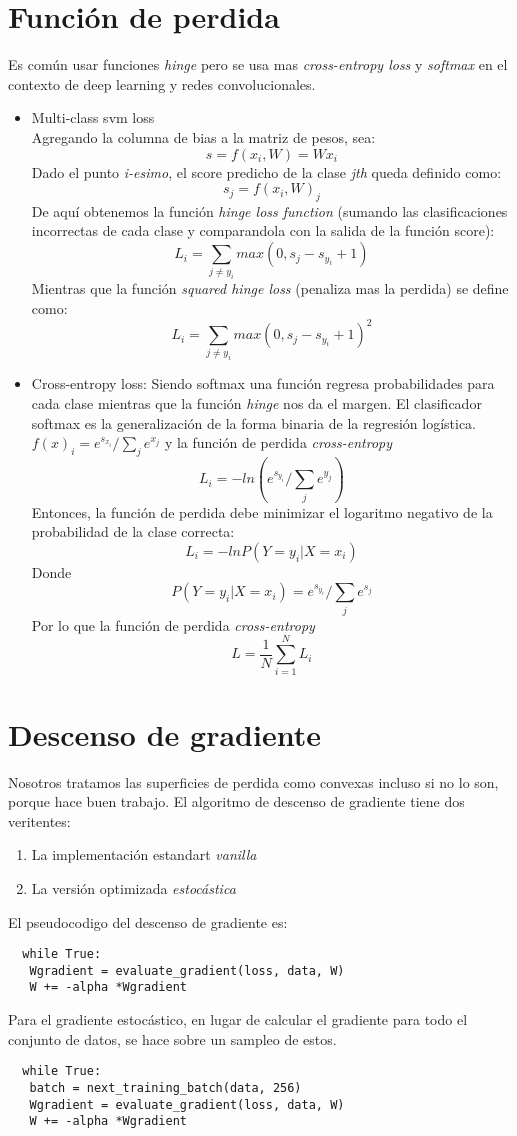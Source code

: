 \documentclass{article}
\begin{document}
\section{Función de perdida}
  Es común usar funciones \textit{hinge} pero se usa mas 
  \textit{cross-entropy loss} y \textit{softmax} en el contexto de
  deep learning y redes convolucionales.
  \begin{itemize}
      \item Multi-class svm loss \\
       Agregando la columna de bias a la matriz de pesos, sea:
       \[
       s = f(x_i, W) = Wx_i
       \]
	   Dado el punto \textit{i-esimo}, el score predicho de la clase \textit{jth} queda definido como:
	   \[
	   s_j = f(x_i, W)_j
	   \]
	   De aquí obtenemos la función \textit{hinge loss function}
	   (sumando las clasificaciones incorrectas de cada clase y
	   comparandola con la salida de la función score):
	   \[
	   L_i = \sum_{j \neq y_i} max(0, s_j - s_{y_i}+1)
	   \]
	   Mientras que la función \textit{squared hinge loss} (penaliza
	   mas la perdida) se define como:
	   \[
	   L_i = \sum_{j \neq y_i} max(0, s_j - s_{y_i}+1)^2
	   \]
    \item Cross-entropy loss: Siendo softmax una función regresa probabilidades 
    para cada clase mientras que la función  \textit{hinge} nos da el margen. El
    clasificador softmax es la generalización de la forma binaria de la regresión
    logística. $f(x)_i = e^{s_{x_i}}/\sum_{j}e^{x_j}$ y la función de perdida \textit{cross-entropy}
    \[
    L_i = -ln(e^{s_{y_i}}/\sum_{j}e^{y_j})
    \]
    Entonces, la función de perdida debe minimizar el logaritmo negativo de la
    probabilidad de la clase correcta: 
    \[
    L_i = -lnP(Y=y_i|X=x_i) 
    \]
    Donde 
    \[
    P(Y=y_i|X=x_i) = e^{s_{y_i}}/\sum_j e^{s_j}
    \]
    Por lo que la función de perdida \textit{cross-entropy}
    \[
    L = \frac{1}{N} \sum_{i=1}^N L_i
    \]
\end{itemize}
\section{Descenso de gradiente}
Nosotros tratamos las superficies de perdida como convexas incluso si no lo son,
porque hace buen trabajo.
El algoritmo de descenso de gradiente tiene dos veritentes:
\begin{enumerate}
    \item La implementación estandart \textit{vanilla}
    \item La versión optimizada \textit{estocástica}
\end{enumerate}
El pseudocodigo del descenso de gradiente es:
 \begin{lstlisting}
  while True:
   Wgradient = evaluate_gradient(loss, data, W)
   W += -alpha *Wgradient
 \end{lstlisting}
Para el gradiente estocástico, en lugar de calcular el gradiente para todo el conjunto de datos, se hace sobre un sampleo de estos. 
 \begin{lstlisting}
  while True:
   batch = next_training_batch(data, 256)
   Wgradient = evaluate_gradient(loss, data, W)
   W += -alpha *Wgradient
 \end{lstlisting}
\end{document}
